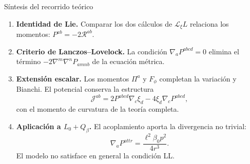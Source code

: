 \begin{frame}[label=nav-frame-123]{Síntesis del recorrido teórico}
\small
\begin{enumerate}
  \item \textbf{Identidad de Lie.}
  Comparar los dos cálculos de $\mathcal L_\xi L$ relaciona los momentos:
  $P^{ab}=-2\mathcal R^{ab}$.
  \medskip
  \item \textbf{Criterio de Lanczos--Lovelock.}
  La condición $\nabla_aP^{abcd}=0$ elimina el término
  $-2\nabla^m\nabla^nP_{amnb}$ de la ecuación métrica.
  \medskip
  \item \textbf{Extensión escalar.}
  Los momentos $\Pi^a$ y $F_\phi$ completan la variación y Bianchi.
  El potencial conserva la estructura
  \[
  \mathcal J^{ab}=2P^{abcd}\nabla_c\xi_d
  -4\xi_d\nabla_cP^{abcd},
  \]
  con el momento de curvatura de la teoría completa.
  \medskip
  \item \textbf{Aplicación a $L_0+Q_\beta$.}
  El acoplamiento aporta la divergencia no trivial:
  \[
  \nabla_aP^{attr}=\frac{\ell^2\beta_0p^2}{4r^3}.
  \]
  El modelo no satisface en general la condición LL.
\end{enumerate}
\end{frame}
